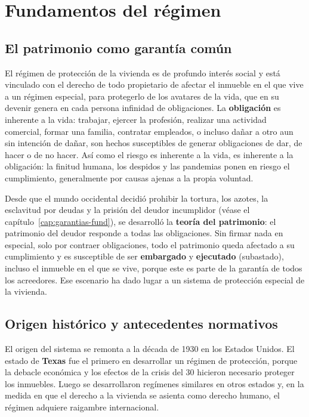 \documentclass[12pt,oneside]{book}
\begin{document}
\section{Fundamentos del régimen}

\subsection{El patrimonio como garantía común}

El régimen de protección de la vivienda es de profundo interés social y está vinculado con el derecho de todo propietario de afectar el inmueble en el que vive a un régimen especial, para protegerlo de los avatares de la vida, que en su devenir genera en cada persona infinidad de obligaciones. La \textbf{obligación} es inherente a la vida: trabajar, ejercer la profesión, realizar una actividad comercial, formar una familia, contratar empleados, o incluso dañar a otro aun sin intención de dañar, son hechos susceptibles de generar obligaciones de dar, de hacer o de no hacer. Así como el riesgo es inherente a la vida, es inherente a la obligación: la finitud humana, los despidos y las pandemias ponen en riesgo el cumplimiento, generalmente por causas ajenas a la propia voluntad.

Desde que el mundo occidental decidió prohibir la tortura, los azotes, la esclavitud por deudas y la prisión del deudor incumplidor (véase el capítulo~\ref{cap:garantias-fund}), se desarrolló la \textbf{teoría del patrimonio}: el patrimonio del deudor responde a todas las obligaciones. Sin firmar nada en especial, solo por contraer obligaciones, todo el patrimonio queda afectado a su cumplimiento y es susceptible de ser \textbf{embargado} y \textbf{ejecutado} (subastado), incluso el inmueble en el que se vive, porque este es parte de la garantía de todos los acreedores. Ese escenario ha dado lugar a un sistema de protección especial de la vivienda.

\subsection{Origen histórico y antecedentes normativos}

El origen del sistema se remonta a la década de 1930 en los Estados Unidos. El estado de \textbf{Texas} fue el primero en desarrollar un régimen de protección, porque la debacle económica y los efectos de la crisis del 30 hicieron necesario proteger los inmuebles. Luego se desarrollaron regímenes similares en otros estados y, en la medida en que el derecho a la vivienda se asienta como derecho humano, el régimen adquiere raigambre internacional.
\end{document}
